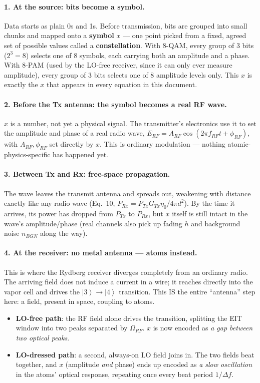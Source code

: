 \documentclass[11pt]{article}
\newcommand{\ket}[1]{\left|#1\right\rangle}
\begin{document}
\paragraph{1. At the source: bits become a symbol.}
Data starts as plain 0s and 1s. Before transmission, bits are grouped into small chunks and mapped onto a \textbf{symbol} $x$ --- one point picked from a fixed, agreed set of possible values called a \textbf{constellation}. With 8-QAM, every group of 3 bits ($2^3=8$) selects one of 8 symbols, each carrying both an amplitude and a phase. With 8-PAM (used by the LO-free receiver, since it can only ever measure amplitude), every group of 3 bits selects one of 8 amplitude levels only. This $x$ is exactly the $x$ that appears in every equation in this document.

\paragraph{2. Before the Tx antenna: the symbol becomes a real RF wave.}
$x$ is a number, not yet a physical signal. The transmitter's electronics use it to set the amplitude and phase of a real radio wave, $E_{RF}=A_{RF}\cos(2\pi f_{RF}t+\phi_{RF})$, with $A_{RF},\phi_{RF}$ set directly by $x$. This is ordinary modulation --- nothing atomic-physics-specific has happened yet.

\paragraph{3. Between Tx and Rx: free-space propagation.}
The wave leaves the transmit antenna and spreads out, weakening with distance exactly like any radio wave (Eq.~10, $P_{Rx}=P_{Tx}G_{Tx}\eta_0/4\pi d^2$). By the time it arrives, its power has dropped from $P_{Tx}$ to $P_{Rx}$, but $x$ itself is still intact in the wave's amplitude/phase (real channels also pick up fading $h$ and background noise $n_{BGN}$ along the way).

\paragraph{4. At the receiver: no metal antenna --- atoms instead.}
This is where the Rydberg receiver diverges completely from an ordinary radio. The arriving field does not induce a current in a wire; it reaches directly into the vapor cell and drives the $\ket3\to\ket4$ transition. This IS the entire ``antenna'' step here: a field, present in space, coupling to atoms.
\begin{itemize}[nosep]
\item \textbf{LO-free path}: the RF field alone drives the transition, splitting the EIT window into two peaks separated by $\Omega_{RF}$. $x$ is now encoded as \emph{a gap between two optical peaks}.
\item \textbf{LO-dressed path}: a second, always-on LO field joins in. The two fields beat together, and $x$ (amplitude \emph{and} phase) ends up encoded as \emph{a slow oscillation} in the atoms' optical response, repeating once every beat period $1/\Delta f$.
\end{itemize}
\end{document}

